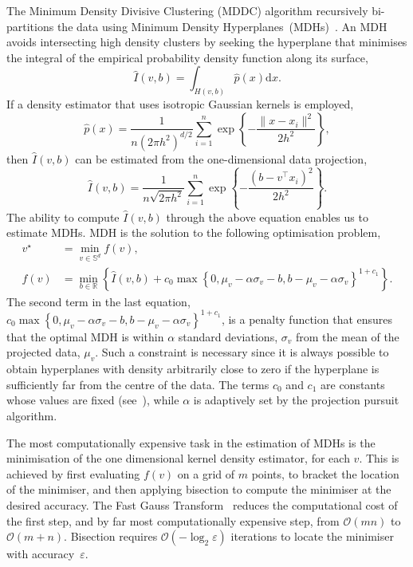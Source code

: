 \documentclass{book}
\def\R{\mathbb{R}}
\begin{document}
The Minimum Density Divisive Clustering (MDDC) algorithm recursively
bi-partitions the data using Minimum Density
Hyperplanes~(MDHs)~\cite{PavlidisHT2016}. An MDH
avoids intersecting high density clusters by seeking the hyperplane
that minimises the integral of the empirical probability density function along
its surface,
%
\[
\hat{I}(v,b) = \int_{ H(v,b)} \hat{p}(x) \mathrm{d} x.
\]
%
If a density estimator that uses isotropic Gaussian kernels is employed,
%
\[
\hat{p}(x) = \frac{1}{n (2 \pi h^2)^{d/2} } \sum_{i=1}^n \exp \left\{ -\frac{ \|x - x_i \|^2}{2 h^2} \right\},
\]
%
then $\hat{I}(v,b)$ can be estimated from the one-dimensional data projection,
%
\[
\hat{I}(v,b) = \frac{1}{n\sqrt{2\pi h^2 }} \sum_{i=1}^n  \exp \left\{- \frac{ (b - v^\top x_i)^2 }{2 h^2} \right\}.
\]
%
The ability to compute $\hat{I}(v,b)$ through the above equation enables us to
estimate MDHs. MDH is the solution to the following optimisation problem,
%
\begin{align}
%
v^\star & = \min_{v \in \mathbb{S}^d} f(v), \label{eq:mdh1} \\
%
f(v) & = \min_{b \in \R} \left\{ \hat{I}(v,b) + c_0 \max \left\{0, \mu_v  -\alpha
\sigma_v - b, b - \mu_v  -\alpha \sigma_v \right\}^{1+c_1} \right\}. \label{eq:mdh2}
%
\end{align}
%
The second term in the last equation, $c_0 \max \left\{0, \mu_v  -\alpha
\sigma_v - b, b - \mu_v  -\alpha \sigma_v \right\}^{1+c_1}$,
is a penalty function that ensures that
the optimal MDH is within $\alpha$ standard deviations, $\sigma_v$ from the mean of the
projected data, $\mu_v$. Such a constraint is necessary since it is always possible
to obtain hyperplanes with density arbitrarily close to zero if the hyperplane is sufficiently
far from the centre of the data.
%
The terms $c_0$ and $c_1$ are constants whose values are fixed (see~\cite{PavlidisHT2016}),
while $\alpha$ is adaptively set by the projection pursuit algorithm.


The most computationally expensive task in the estimation of MDHs is the minimisation of
the one dimensional kernel density estimator, for each $v$.
This is achieved by first evaluating $f(v)$ on a grid of $m$ points, to bracket the location
of the minimiser, and then applying bisection to compute the minimiser
at the desired accuracy.
%
The Fast Gauss Transform~\cite{Morariu08} reduces the computational
cost of the first step, and by far most computationally expensive step,
from $\mathcal{O}(mn)$ to $\mathcal{O}(m+n)$. Bisection requires $\mathcal{O}(-\log_2
\varepsilon)$ iterations to locate the minimiser with accuracy~$\varepsilon$.
\end{document}
